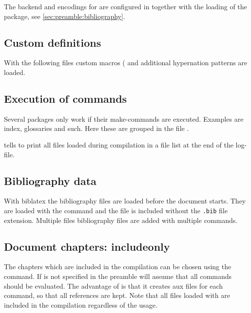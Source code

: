 The backend and encodings for  are configured in  together with the loading of the package, see \cref{sec:preamble:bibliography}.
\subsection{Custom definitions}
With the following files custom macros ( and additional hypernation patterns  are loaded. 

\subsection{Execution of commands}
\label{sec:ExecutionOfCommands}
Several packages only work if their make-commands are executed. Examples are index, glossaries and such. Here these are grouped in the file . 

 tells \latex to print all files loaded during compilation in a file list at the end of the log-file.
%

\subsection{Bibliography data}
With biblatex the bibliography files are loaded before the document starts. 
They are loaded with the command  and the file is included without the \texttt{.bib} file extension. Multiple files bibliography files are added with multiple  commands.

\subsection{Document chapters: includeonly}
\label{sec:main:includeonly}
The chapters which are included in the compilation can be chosen using the  command. If  is not specified in the preamble \latex will assume that all  commands should be evaluated. The advantage of  is that it creates aux files for each  command, so that all references are kept. Note that all files loaded with  are included in the compilation regardless of the  usage.

